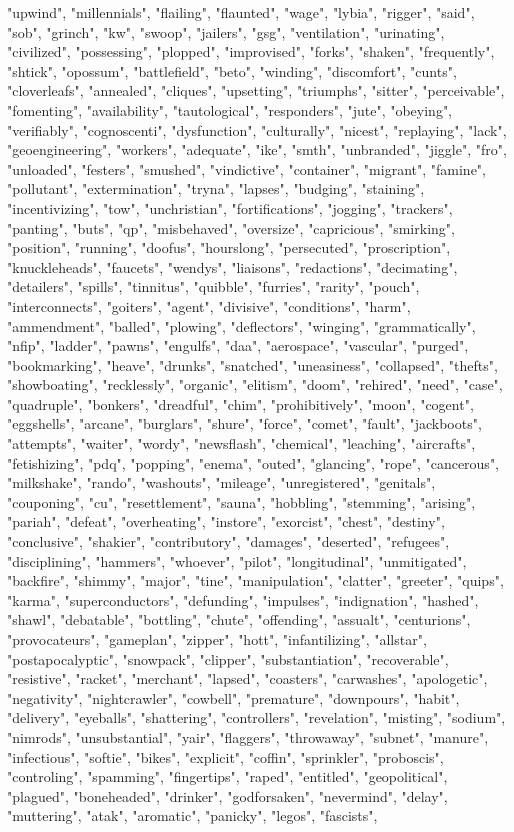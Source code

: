 "upwind", "millennials", "flailing", "flaunted", "wage", "lybia", "rigger", "said", "sob", "grinch", "kw", "swoop", "jailers", "gsg", "ventilation", "urinating", "civilized", "possessing", "plopped", "improvised", "forks", "shaken", "frequently", "shtick", "opossum", "battlefield", "beto", "winding", "discomfort", "cunts", "cloverleafs", "annealed", "cliques", "upsetting", "triumphs", "sitter", "perceivable", "fomenting", "availability", "tautological", "responders", "jute", "obeying", "verifiably", "cognoscenti", "dysfunction", "culturally", "nicest", "replaying", "lack", "geoengineering", "workers", "adequate", "ike", "smth", "unbranded", "jiggle", "fro", "unloaded", "festers", "smushed", "vindictive", "container", "migrant", "famine", "pollutant", "extermination", "tryna", "lapses", "budging", "staining", "incentivizing", "tow", "unchristian", "fortifications", "jogging", "trackers", "panting", "buts", "qp", "misbehaved", "oversize", "capricious", "smirking", "position", "running", "doofus", "hourslong", "persecuted", "proscription", "knuckleheads", "faucets", "wendys", "liaisons", "redactions", "decimating", "detailers", "spills", "tinnitus", "quibble", "furries", "rarity", "pouch", "interconnects", "goiters", "agent", "divisive", "conditions", "harm", "ammendment", "balled", "plowing", "deflectors", "winging", "grammatically", "nfip", "ladder", "pawns", "engulfs", "daa", "aerospace", "vascular", "purged", "bookmarking", "heave", "drunks", "snatched", "uneasiness", "collapsed", "thefts", "showboating", "recklessly", "organic", "elitism", "doom", "rehired", "need", "case", "quadruple", "bonkers", "dreadful", "chim", "prohibitively", "moon", "cogent", "eggshells", "arcane", "burglars", "shure", "force", "comet", "fault", "jackboots", "attempts", "waiter", "wordy", "newsflash", "chemical", "leaching", "aircrafts", "fetishizing", "pdq", "popping", "enema", "outed", "glancing", "rope", "cancerous", "milkshake", "rando", "washouts", "mileage", "unregistered", "genitals", "couponing", "cu", "resettlement", "sauna", "hobbling", "stemming", "arising", "pariah", "defeat", "overheating", "instore", "exorcist", "chest", "destiny", "conclusive", "shakier", "contributory", "damages", "deserted", "refugees", "disciplining", "hammers", "whoever", "pilot", "longitudinal", "unmitigated", "backfire", "shimmy", "major", "tine", "manipulation", "clatter", "greeter", "quips", "karma", "superconductors", "defunding", "impulses", "indignation", "hashed", "shawl", "debatable", "bottling", "chute", "offending", "assualt", "centurions", "provocateurs", "gameplan", "zipper", "hott", "infantilizing", "allstar", "postapocalyptic", "snowpack", "clipper", "substantiation", "recoverable", "resistive", "racket", "merchant", "lapsed", "coasters", "carwashes", "apologetic", "negativity", "nightcrawler", "cowbell", "premature", "downpours", "habit", "delivery", "eyeballs", "shattering", "controllers", "revelation", "misting", "sodium", "nimrods", "unsubstantial", "yair", "flaggers", "throwaway", "subnet", "manure", "infectious", "softie", "bikes", "explicit", "coffin", "sprinkler", "proboscis", "controling", "spamming", "fingertips", "raped", "entitled", "geopolitical", "plagued", "boneheaded", "drinker", "godforsaken", "nevermind", "delay", "muttering", "atak", "aromatic", "panicky", "legos", "fascists", 